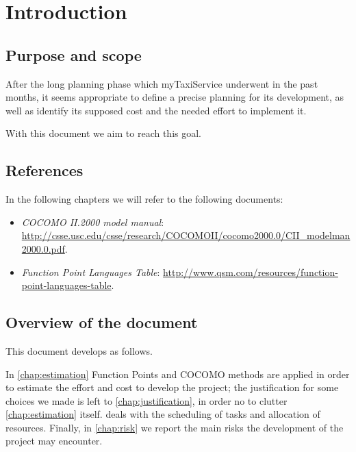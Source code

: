 \chapter{Introduction}\label{chap:introduction}


\section{Purpose and scope}
After the long planning phase which myTaxiService underwent in the past months, it seems appropriate to define a precise planning for its development, as well as identify its supposed cost and the needed effort to implement it.

With this document we aim to reach this goal.



\section{References}\label{sec:references}
In the following chapters we will refer to the following documents:

\begin{itemize}
	\item \emph{COCOMO II.2000 model manual}: \url{http://csse.usc.edu/csse/research/COCOMOII/cocomo2000.0/CII_modelman2000.0.pdf}.
	\item \emph{Function Point Languages Table}: \url{http://www.qsm.com/resources/function-point-languages-table}.
\end{itemize}


\section{Overview of the document} 
This document develops as follows.

In \cref{chap:estimation} Function Points and COCOMO methods are applied in order to estimate the effort and cost to develop the project; the justification for some choices we made is left to \cref{chap:justification}, in order no to clutter \cref{chap:estimation} itself.  deals with the scheduling of tasks and allocation of resources. Finally, in \cref{chap:risk} we report the main risks the development of the project may encounter. 





